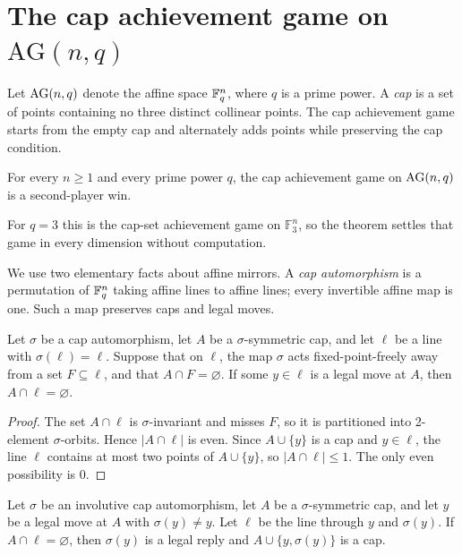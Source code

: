 \section{The cap achievement game on \texorpdfstring{$\mathrm{AG}(n,q)$}{AG(n,q)}}
\label{sec:affine-cap}

Let $\mathrm{AG}(n,q)$ denote the affine space $\mathbb{F}_q^n$, where $q$ is a prime power. A
\emph{cap} is a set of points containing no three distinct collinear points. The cap
achievement game starts from the empty cap and alternately adds points while preserving
the cap condition.

\begin{theorem}
\label{thm:affine-cap}
For every $n\geq 1$ and every prime power $q$, the cap achievement game on $\mathrm{AG}(n,q)$
is a second-player win.
\end{theorem}

For $q=3$ this is the cap-set achievement game on $\mathbb F_3^n$, so the theorem settles
that game in every dimension without computation.

We use two elementary facts about affine mirrors. A \emph{cap automorphism} is a
permutation of $\mathbb{F}_q^n$ taking affine lines to affine lines; every invertible affine map is
one. Such a map preserves caps and legal moves.

\begin{lemma}
\label{lem:affine-line-parity}
Let $\sigma$ be a cap automorphism, let $A$ be a $\sigma$-symmetric cap, and let $\ell$
be a line with $\sigma(\ell)=\ell$. Suppose that on $\ell$, the map $\sigma$ acts
fixed-point-freely away from a set $F\subseteq \ell$, and that $A\cap F=\varnothing$.
If some $y\in \ell$ is a legal move at $A$, then $A\cap \ell=\varnothing$.
\end{lemma}

\begin{proof}
The set $A\cap\ell$ is $\sigma$-invariant and misses $F$, so it is partitioned into
2-element $\sigma$-orbits. Hence $|A\cap\ell|$ is even. Since $A\cup\{y\}$ is a cap and
$y\in\ell$, the line $\ell$ contains at most two points of $A\cup\{y\}$, so
$|A\cap\ell|\leq 1$. The only even possibility is $0$.
\end{proof}

\begin{lemma}
\label{lem:affine-mirror-step}
Let $\sigma$ be an involutive cap automorphism, let $A$ be a $\sigma$-symmetric cap, and
let $y$ be a legal move at $A$ with $\sigma(y)\neq y$. Let $\ell$ be the line through
$y$ and $\sigma(y)$. If $A\cap\ell=\varnothing$, then $\sigma(y)$ is a legal reply and
$A\cup\{y,\sigma(y)\}$ is a cap.
\end{lemma}

